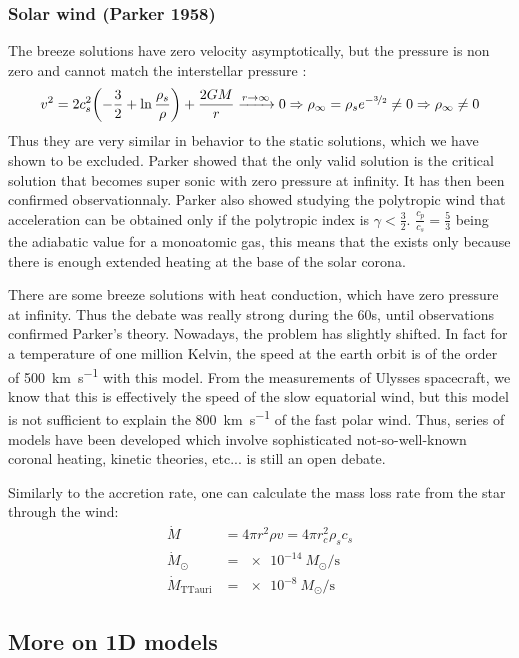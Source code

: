 \documentclass[10pt,a4paper,english]{article}
\let\originalleft\left
\let\originalright\right
\renewcommand{\left}{\mathopen{}\mathclose\bgroup\originalleft}
\renewcommand{\right}{\aftergroup\egroup\originalright}
\begin{document}
\subsubsection{Solar wind (Parker 1958)}
The breeze solutions have zero velocity asymptotically, but the pressure is non zero and cannot match the interstellar pressure :
\begin{equation}
    v^2 = 2 c_s^2 \left( -\frac{3}{2} + \ln \frac{\rho_s}{\rho} \right) + \frac{2GM}{r} \xrightarrow{r\to\infty} 0\Rightarrow \rho_\infty = \rho_s e^{-\nicefrac{3}{2}} \neq 0 \Rightarrow \rho_\infty \neq 0
\end{equation}
Thus they are very similar in behavior to the static solutions, which we have shown to be excluded. Parker showed that the only valid solution is the critical solution that becomes super sonic with zero pressure at infinity. It has then been confirmed observationnaly. Parker also showed studying the polytropic wind that acceleration can be obtained only if the polytropic index is $\gamma < \frac{3}{2}$. $\frac{c_p}{c_s} = \frac{5}{3}$ being the adiabatic value for a monoatomic gas, this means that the exists only because there is enough extended heating at the base of the solar corona.

There are some breeze solutions with heat conduction, which have zero pressure at infinity. Thus the debate was really strong during the 60s, until observations confirmed Parker's theory. Nowadays, the problem has slightly shifted. In fact for a temperature of one million Kelvin, the speed at the earth orbit is of the order of \SI{500}{\km\per\s} with this model. From the measurements of Ulysses spacecraft, we know that this is effectively the speed of the slow equatorial wind, but this model is not sufficient to explain the \SI{800}{\km\per\s} of the fast polar wind. Thus, series of models have been developed which involve sophisticated not-so-well-known coronal heating, kinetic theories, etc... is still an open debate.

Similarly to the accretion rate, one can calculate the mass loss rate from the star through the wind:
\begin{align}
    \dot{M} & = 4\pi r^2\rho v = 4\pi r^2_c\rho_sc_s \\
    \dot{M}_\odot & = \SI{e-14}{M_\odot\per\s} \\
    \dot{M}_\mathrm{TTauri} &= \SI{e-8}{M_\odot\per\s}
\end{align}

\subsection{More on 1D models}
\end{document}
